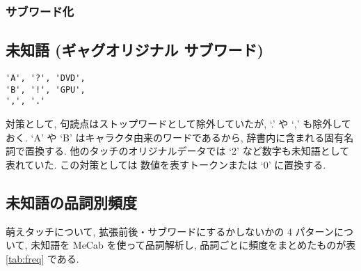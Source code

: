 \documentclass[twocolumn]{jarticle}     %
\begin{document}
\subsubsection{サブワード化}


\begin{table}[htb]
\begin{center}
\caption{データセットに含まれる未知語率(サブワード化)}
\end{center}
\end{table}

\subsection{未知語 (ギャグオリジナル サブワード)}
\begin{verbatim}
'A', '?', 'DVD',
'B', '!', 'GPU',
',', '.'
\end{verbatim}

対策として, 句読点はストップワードとして除外していたが, `.' や `,' も除外しておく.
`A' や `B' はキャラクタ由来のワードであるから, 辞書内に含まれる固有名詞で置換する.
他のタッチのオリジナルデータでは `2' など数字も未知語として表れていた. この対策としては 数値を表すトークンまたは `0' に置換する.

\subsection{未知語の品詞別頻度}
萌えタッチについて, 拡張前後・サブワードにするかしないかの 4 パターンについて,
未知語を MeCab を使って品詞解析し, 品詞ごとに頻度をまとめたものが表\ref{tab:freq} である.
\end{document}
